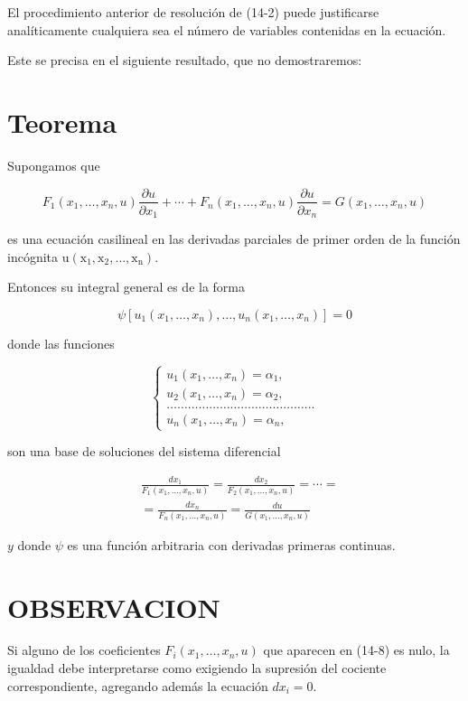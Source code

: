 \documentclass[10pt]{article}
\theoremstyle{plain}
\theoremstyle{definition}
\theoremstyle{remark}
\begin{document}
El procedimiento anterior de resolución de (14-2) puede justificarse analíticamente cualquiera sea el número de variables contenidas en la ecuación.

Este se precisa en el siguiente resultado, que no demostraremos:

\section*{Teorema}
Supongamos que

$$
F_{1}\left(x_{1}, \ldots, x_{n}, u\right) \frac{\partial u}{\partial x_{1}}+\cdots+F_{n}\left(x_{1}, \ldots, x_{n}, u\right) \frac{\partial u}{\partial x_{n}}=G\left(x_{1}, \ldots, x_{n}, u\right)
$$

es una ecuación casilineal en las derivadas parciales de primer orden de la función incógnita $\mathrm{u}\left(\mathrm{x}_{1}, \mathrm{x}_{2}, \ldots, \mathrm{x}_{\mathrm{n}}\right)$.

Entonces su integral general es de la forma

$$
\psi\left[u_{1}\left(x_{1}, \ldots, x_{n}\right), \ldots, u_{n}\left(x_{1}, \ldots, x_{n}\right)\right]=0
$$

donde las funciones


$$
\left\{\begin{array}{l}
u_{1}\left(x_{1}, \ldots, x_{n}\right)=\alpha_{1}, \\
u_{2}\left(x_{1}, \ldots, x_{n}\right)=\alpha_{2}, \\
\ldots \ldots \ldots \ldots \ldots \ldots \ldots \ldots \ldots \ldots \ldots \ldots \ldots \ldots \\
u_{n}\left(x_{1}, \ldots, x_{n}\right)=\alpha_{n},
\end{array}\right.
$$

son una base de soluciones del sistema diferencial


\begin{align*}
& \frac{d x_{1}}{F_{1}\left(x_{1}, \ldots, x_{n}, u\right)}=\frac{d x_{2}}{F_{2}\left(x_{1}, \ldots, x_{n}, u\right)}=\cdots= \\
& =\frac{d x_{n}}{F_{n}\left(x_{1}, \ldots, x_{n}, u\right)}=\frac{d u}{G\left(x_{1}, \ldots, x_{n}, u\right)} \tag{14-8}
\end{align*}


$y$ donde $\psi$ es una función arbitraria con derivadas primeras continuas.

\section*{OBSERVACION}
Si alguno de los coeficientes $F_{i}\left(x_{1}, \ldots, x_{n}, u\right)$ que aparecen en (14-8) es nulo, la igualdad debe interpretarse como exigiendo la supresión del cociente correspondiente, agregando además la ecuación $d x_{i}=0$.
\end{document}
